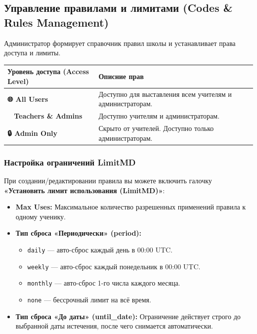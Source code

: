 \documentclass[12pt,a4paper]{article}
\begin{document}
\subsection{Управление правилами и лимитами (Codes \& Rules Management)}
Администратор формирует справочник правил школы и устанавливает права доступа и лимиты.

\begin{table}[h!]
\centering
\begin{tabularx}{\textwidth}{|l|X|}
\hline
\textbf{Уровень доступа (Access Level)} & \textbf{Описние прав} \\ \hline
\textbf{🌐 All Users} & Доступно для выставления всем учителям и администраторам. \\ \hline
\textbf{👨‍🏫 Teachers \& Admins} & Доступно учителям и администраторам. \\ \hline
\textbf{🔒 Admin Only} & Скрыто от учителей. Доступно только администраторам. \\ \hline
\end{tabularx}
\end{table}

\subsubsection{Настройка ограничений LimitMD}
При создании/редактировании правила вы можете включить галочку \textbf{«Установить лимит использования (LimitMD)»}:
\begin{itemize}
    \item \textbf{Max Uses:} Максимальное количество разрешенных применений правила к одному ученику.
    \item \textbf{Тип сброса «Периодически» (period):}
    \begin{itemize}
        \item \texttt{daily} — авто-сброс каждый день в 00:00 UTC.
        \item \texttt{weekly} — авто-сброс каждый понедельник в 00:00 UTC.
        \item \texttt{monthly} — авто-сброс 1-го числа каждого месяца.
        \item \texttt{none} — бессрочный лимит на всё время.
    \end{itemize}
    \item \textbf{Тип сброса «До даты» (until\_date):} Ограничение действует строго до выбранной даты истечения, после чего снимается автоматически.
\end{itemize}
\end{document}
